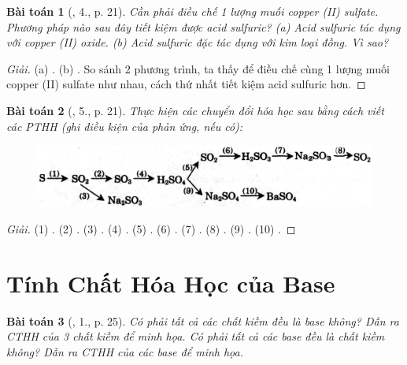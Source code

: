 \documentclass{article}
\newtheorem{baitoan}{Bài toán}
\begin{document}
\begin{baitoan}[\cite{SGK_Hoa_Hoc_9}, 4., p. 21]
	Cần phải điều chế 1 lượng muối copper {\rm(II)} sulfate. Phương pháp nào sau đây tiết kiệm được acid sulfuric? (a) Acid sulfuric tác dụng với copper {\rm(II)} oxide. (b) Acid sulfuric đặc tác dụng với kim loại đồng. Vì sao?
\end{baitoan}

\begin{proof}[Giải]
	(a) . (b) . So sánh 2 phương trình, ta thấy để điều chế cùng 1 lượng muối copper (II) sulfate như nhau, cách thứ nhất tiết kiệm acid sulfuric hơn.
\end{proof}

\begin{baitoan}[\cite{SGK_Hoa_Hoc_9}, 5., p. 21]
	Thực hiện các chuyển đổi hóa học sau bằng cách viết các {\rm PTHH} (ghi điều kiện của phản ứng, nếu có):
	\begin{figure}[H]
		\centering
		\includegraphics[scale=.3]{S1}
	\end{figure}
\end{baitoan}

\begin{proof}[Giải]
	(1) . (2) . (3) . (4) . (5) . (6) . (7) . (8) . (9) . (10) .
\end{proof}


\section{Tính Chất Hóa Học của Base}

\begin{baitoan}[\cite{SGK_Hoa_Hoc_9}, 1., p. 25]
	Có phải tất cả các chất kiềm đều là base không? Dẫn ra CTHH của 3 chất kiềm để minh họa. Có phải tất cả các base đều là chất kiềm không? Dẫn ra {\rm CTHH} của các base để minh họa.
\end{baitoan}
\end{document}

